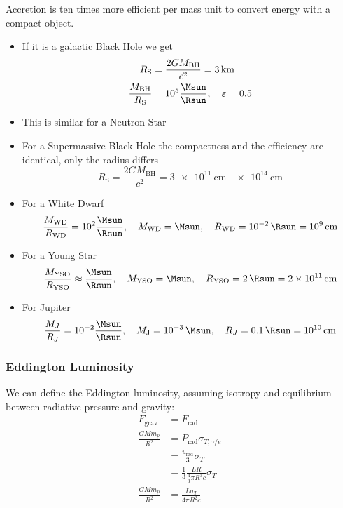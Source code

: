 \documentclass[10pt,a4paper,english]{article}
\begin{document}
Accretion is ten times more efficient per mass unit to convert energy with a
compact object.
\begin{itemize}
    \item If it is a galactic Black Hole we get
          \begin{align*}
              R_\mathrm{S} &=\frac{2 G M_\mathrm{BH}}{c^2} = \SI{3}{\km} \\
              \frac{M_\mathrm{BH}}{R_\mathrm{S}} &= 10^5 \frac{\si{\Msun}}{\si{\Rsun}}, \quad \varepsilon = 0.5
          \end{align*}
    \item This is similar for a Neutron Star
    \item For a Supermassive Black Hole the compactness and the efficiency are
          identical, only the radius differs
          \begin{equation*}
              R_\mathrm{S} =\frac{2 G M_\mathrm{BH}}{c^2} = \SIrange{3e11}{e14}{\cm}
          \end{equation*}
    \item For a White Dwarf
          \begin{equation*}
              \frac{M_\mathrm{WD}}{R_\mathrm{WD}} = 10^2 \frac{\si{\Msun}}{\si{\Rsun}}, \quad M_\mathrm{WD} = \si{\Msun}, \quad R_\mathrm{WD} = \SI{e-2}{\Rsun} = \SI{e9}{\cm}
          \end{equation*}
    \item For a Young Star
          \begin{equation*}
              \frac{M_\mathrm{YSO}}{R_\mathrm{YSO}} \approx \frac{\si{\Msun}}{\si{\Rsun}}, \quad M_\mathrm{YSO} = \si{\Msun}, \quad R_\mathrm{YSO} = \SI{2}{\Rsun} = \SI{2e11}{\cm}
          \end{equation*}
    \item For Jupiter
          \begin{equation*}
              \frac{M_J}{R_J} = 10^{-2} \frac{\si{\Msun}}{\si{\Rsun}}, \quad M_\mathrm{J} = \SI{e-3}{\Msun}, \quad R_J = \SI{0.1}{\Rsun} = \SI{e10}{\cm}
          \end{equation*}
\end{itemize}

\subsubsection{Eddington Luminosity}

We can define the Eddington luminosity, assuming isotropy and equilibrium
between radiative pressure and gravity:
\begin{align*}
    F_\mathrm{grav} & = F_\mathrm{rad} \\
    \frac{G M m_p}{R^2} &= P_\mathrm{rad}\sigma_{T,\gamma/e^-} \\
                        &= \frac{u_\mathrm{rad}}{3}\sigma_T \\
                        &= \frac{1}{3}\frac{L R}{\frac{4}{3}\pi R^3 c}\sigma_T\\
    \frac{G M m_p}{R^2} &= \frac{L\sigma_T}{4\pi R^2 c}
\end{align*}
\end{document}

